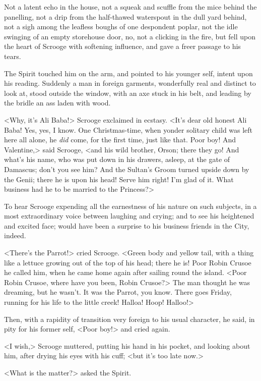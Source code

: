 Not a latent echo in the house, not a squeak and scuffle from the mice behind
the panelling, not a drip from the half-thawed waterspout in the dull yard
behind, not a sigh among the leafless boughs of one despondent poplar, not the
idle swinging of an empty storehouse door, no, not a clicking in the fire, but
fell upon the heart of Scrooge with softening influence, and gave a freer
passage to his tears.

The Spirit touched him on the arm, and pointed to his younger self, intent upon
his reading. Suddenly a man in foreign garments, wonderfully real and distinct
to look at, stood outside the window, with an axe stuck in his belt, and leading
by the bridle an ass laden with wood.

<Why, it's Ali Baba!> Scrooge exclaimed in ecstasy. <It's dear old honest Ali
Baba! Yes, yes, I know. One Christmas-time, when yonder solitary child was left
here all alone, he \emph{did} come, for the first time, just like that. Poor
boy! And Valentine,> said Scrooge, <and his wild brother, Orson; there they go!
And what's his name, who was put down in his drawers, asleep, at the gate of
Damascus; don't you see him? And the Sultan's Groom turned upside down by the
Genii; there he is upon his head! Serve him right! I'm glad of it. What business
had he to be married to the Princess?>

To hear Scrooge expending all the earnestness of his nature on such subjects, in
a most extraordinary voice between laughing and crying; and to see his
heightened and excited face; would have been a surprise to his business friends
in the City, indeed.

<There's the Parrot!> cried Scrooge. <Green body and yellow tail, with a thing
like a lettuce growing out of the top of his head; there he is! Poor Robin
Crusoe he called him, when he came home again after sailing round the island.
<Poor Robin Crusoe, where have you been, Robin Crusoe?> The man thought he was
dreaming, but he wasn't. It was the Parrot, you know. There goes Friday, running
for his life to the little creek! Halloa! Hoop! Halloo!>

Then, with a rapidity of transition very foreign to his usual character, he
said, in pity for his former self, <Poor boy!> and cried again.

<I wish,> Scrooge muttered, putting his hand in his pocket, and looking about
him, after drying his eyes with his cuff; <but it's too late now.>

<What is the matter?> asked the Spirit.


